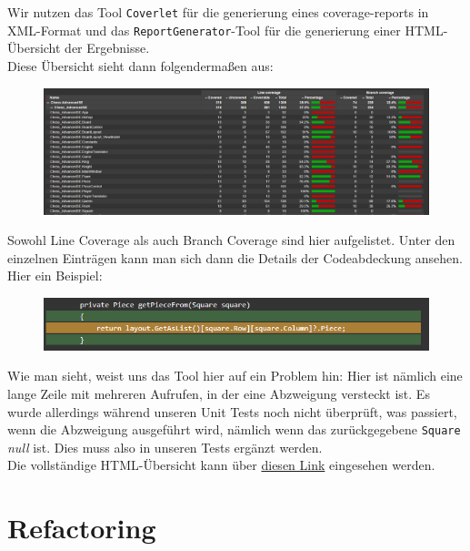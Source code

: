 \documentclass[
10pt, %
a4paper, %
oneside, %
headinclude,footinclude, %
BCOR5mm, %
]{scrartcl}
\begin{document}
\begin{onehalfspace}
Wir nutzen das Tool \texttt{Coverlet} für die generierung eines coverage-reports in XML-Format und das \texttt{ReportGenerator}-Tool für die generierung einer HTML-Übersicht der Ergebnisse.
\\
Diese Übersicht sieht dann folgendermaßen aus:
\begin{figure}[ht!]
	\includegraphics[width=\linewidth]{coveragereport}
\end{figure}

Sowohl Line Coverage als auch Branch Coverage sind hier aufgelistet. Unter den einzelnen Einträgen kann man sich dann die Details der Codeabdeckung ansehen.
Hier ein Beispiel:
\begin{figure}[ht!]
	\includegraphics[width=\linewidth]{methodcovered}
\end{figure}

Wie man sieht, weist uns das Tool hier auf ein Problem hin: Hier ist nämlich eine lange Zeile mit mehreren Aufrufen, in der eine Abzweigung versteckt ist. Es wurde allerdings während unseren Unit Tests noch nicht überprüft, was passiert, wenn die Abzweigung ausgeführt wird, nämlich wenn das zurückgegebene \texttt{Square} \textsl{null} ist. Dies muss also in unseren Tests ergänzt werden.
\\
Die vollständige HTML-Übersicht kann über \href{https://github.com/schmida736/Chess-AdvancedSE/tree/main/Chess-AdvancedSE.Tests/coverage%20results}{diesen Link} eingesehen werden.

\newpage
\section{Refactoring}

\end{onehalfspace}
\end{document}
